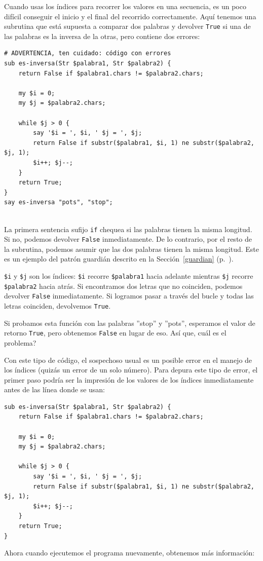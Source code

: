 Cuando usas los índices para recorrer los valores en una secuencia,
es un poco difícil conseguir el inicio y el final del recorrido 
correctamente. Aquí tenemos una subrutina que está supuesta a 
comparar dos palabras y devolver {\tt True} si una de las palabras
es la inversa de la otras, pero contiene dos errores:

\begin{lstlisting}
# ADVERTENCIA, ten cuidado: código con errores
sub es-inversa(Str $palabra1, Str $palabra2) {
    return False if $palabra1.chars != $palabra2.chars;
    
    my $i = 0;
    my $j = $palabra2.chars;

    while $j > 0 {
    	say '$i = ', $i, ' $j = ', $j;
        return False if substr($palabra1, $i, 1) ne substr($palabra2, $j, 1);
        $i++; $j--;
    }
    return True;
}
say es-inversa "pots", "stop";


\end{lstlisting}
%
La primera sentencia sufijo {\tt if} chequea si las palabras
tienen la misma longitud. Si no, podemos devolver {\tt False}
inmediatamente. De lo contrario, por el resto de la subrutina, 
podemos asumir que las dos palabras tienen la misma longitud.
Este es un ejemplo del patrón guardián descrito en la 
Sección~\ref{guardian} (p.~\pageref{guardian}).

{\tt \$i} y {\tt \$j} son los índices: {\tt \$i} 
recorre {\tt \$palabra1} hacia adelante mientras {\tt \$j}
recorre {\tt \$palabra2} hacia atrás. Si encontramos dos letras
que no coinciden, podemos devolver {\tt False} inmediatamente.
Si logramos pasar a través del bucle y todas las letras
coinciden, devolvemos {\tt True}.

Si probamos esta función con las palabras ''stop'' y ''pots'',
esperamos el valor de retorno {\tt True}, pero obtenemos 
{\tt False} en lugar de eso. Así que, cuál es el problema?

Con este tipo de código, el sospechoso usual es un posible error
en el manejo de los índices (quizás un error de un solo número).
Para depura este tipo de error, el primer paso podría ser la
impresión de los valores de los índices inmediatamente 
antes de las línea donde se usan:

\begin{lstlisting}
sub es-inversa(Str $palabra1, Str $palabra2) {
	return False if $palabra1.chars != $palabra2.chars;

	my $i = 0;
	my $j = $palabra2.chars;

	while $j > 0 {
		say '$i = ', $i, ' $j = ', $j;
		return False if substr($palabra1, $i, 1) ne substr($palabra2, $j, 1);
		$i++; $j--;
	}
	return True;
}
\end{lstlisting}
%
Ahora cuando ejecutemos el programa nuevamente, obtenemos
más información:

